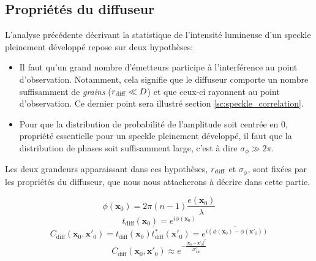 \subsection{Propriétés du diffuseur}
\label{sec:propriete_diffuseur}
L'analyse précédente décrivant la statistique de l'intensité lumineuse d'un speckle pleinement développé repose sur deux hypothèses: 
\begin{itemize}
\item[\textendash] Il faut qu'un grand nombre d'émetteurs participe à l'interférence au point d'observation. Notamment, cela signifie que le diffuseur comporte un nombre suffisamment de \emph{grains} ($r_{\mathrm{diff}} \ll D$)  et que ceux-ci rayonnent au point d'observation. Ce dernier point sera illustré section \ref{sc:speckle_correlation}.
\item[\textendash] Pour que la distribution de probabilité de l'amplitude soit centrée en 0, propriété essentielle pour un speckle pleinement développé, il faut que la distribution de phases soit suffisamment large, c'est à dire $\sigma_\phi \gg 2\pi$. 
\end{itemize}
Les deux grandeurs apparaissant dans ces hypothèses, $r_{\mathrm{diff}}$ et $\sigma_\phi$, sont fixées par les propriétés du diffuseur, que nous nous attacherons à décrire dans cette partie.

\begin{equation}
\phi(\mathbf{x}_0)=2\pi (n-1) \frac{e(\mathbf{x}_0)}{\lambda}
\end{equation}
\begin{equation}
t_{\mathrm{diff}}(\mathbf{x}_0)=e^{i\phi(\mathbf{x}_0)}
\end{equation}
\begin{equation}
C_{\mathrm{diff}}(\mathbf{x}_0,\mathbf{x}'_0)=\overline{t_{\mathrm{diff}}(\mathbf{x}_0)t^*_{\mathrm{diff}}(\mathbf{x}'_0)}=\overline{e^{i(\phi(\mathbf{x}_0)-\phi(\mathbf{x}'_0))}}
\end{equation}
\begin{equation}
C_{\mathrm{diff}}(\mathbf{x}_0,\mathbf{x}'_0)\approx e^{-\frac{\left| \mathbf{x}_0 - \mathbf{x}'_0 \right| ^2}{2 r_{\mathrm{diff}}^2}}
\end{equation}


